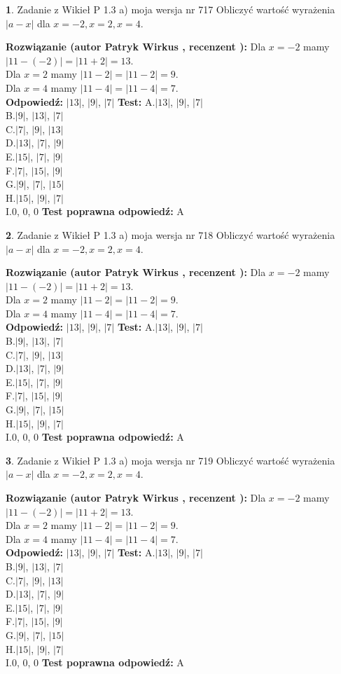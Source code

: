 \documentclass[12pt, a4paper]{article}
\theoremstyle{definition} %
\newtheorem{zad}{}
\newcommand{\zadStart}[1]{\begin{zad}#1\newline}
\newcommand{\zadStop}{\end{zad}}
\newcommand{\rozwStart}[2]{\noindent \textbf{Rozwiązanie (autor #1 , recenzent #2): }\newline}
\newcommand{\rozwStop}{\newline}
\newcommand{\odpStart}{\noindent \textbf{Odpowiedź:}\newline}
\newcommand{\odpStop}{\newline}
\newcommand{\testStart}{\noindent \textbf{Test:}\newline}
\newcommand{\testStop}{\newline}
\newcommand{\kluczStart}{\noindent \textbf{Test poprawna odpowiedź:}\newline}
\newcommand{\kluczStop}{\newline}
\begin{document}
\zadStart{Zadanie z Wikieł P 1.3 a) moja wersja nr 717}
Obliczyć wartość wyrażenia $|a - x|$ dla $x=-2,x=2,x=4$.
\zadStop
\rozwStart{Patryk Wirkus}{}
Dla $x = -2$ mamy $|11 - (-2)| = |11 + 2| = 13$.\\
Dla $x = 2$ mamy $|11 - 2| = |11 - 2| = 9$.\\
Dla $x = 4$ mamy $|11 - 4| = |11 - 4| = 7$.\\
\rozwStop
\odpStart
$|13|$, $|9|$, $|7|$
\odpStop
\testStart
A.$|13|$, $|9|$, $|7|$\\
B.$|9|$, $|13|$, $|7|$\\
C.$|7|$, $|9|$, $|13|$\\
D.$|13|$, $|7|$, $|9|$\\
E.$|15|$, $|7|$, $|9|$\\
F.$|7|$, $|15|$, $|9|$\\
G.$|9|$, $|7|$, $|15|$\\
H.$|15|$, $|9|$, $|7|$\\
I.$0$, $0$, $0$
\testStop
\kluczStart
A
\kluczStop



\zadStart{Zadanie z Wikieł P 1.3 a) moja wersja nr 718}
Obliczyć wartość wyrażenia $|a - x|$ dla $x=-2,x=2,x=4$.
\zadStop
\rozwStart{Patryk Wirkus}{}
Dla $x = -2$ mamy $|11 - (-2)| = |11 + 2| = 13$.\\
Dla $x = 2$ mamy $|11 - 2| = |11 - 2| = 9$.\\
Dla $x = 4$ mamy $|11 - 4| = |11 - 4| = 7$.\\
\rozwStop
\odpStart
$|13|$, $|9|$, $|7|$
\odpStop
\testStart
A.$|13|$, $|9|$, $|7|$\\
B.$|9|$, $|13|$, $|7|$\\
C.$|7|$, $|9|$, $|13|$\\
D.$|13|$, $|7|$, $|9|$\\
E.$|15|$, $|7|$, $|9|$\\
F.$|7|$, $|15|$, $|9|$\\
G.$|9|$, $|7|$, $|15|$\\
H.$|15|$, $|9|$, $|7|$\\
I.$0$, $0$, $0$
\testStop
\kluczStart
A
\kluczStop



\zadStart{Zadanie z Wikieł P 1.3 a) moja wersja nr 719}
Obliczyć wartość wyrażenia $|a - x|$ dla $x=-2,x=2,x=4$.
\zadStop
\rozwStart{Patryk Wirkus}{}
Dla $x = -2$ mamy $|11 - (-2)| = |11 + 2| = 13$.\\
Dla $x = 2$ mamy $|11 - 2| = |11 - 2| = 9$.\\
Dla $x = 4$ mamy $|11 - 4| = |11 - 4| = 7$.\\
\rozwStop
\odpStart
$|13|$, $|9|$, $|7|$
\odpStop
\testStart
A.$|13|$, $|9|$, $|7|$\\
B.$|9|$, $|13|$, $|7|$\\
C.$|7|$, $|9|$, $|13|$\\
D.$|13|$, $|7|$, $|9|$\\
E.$|15|$, $|7|$, $|9|$\\
F.$|7|$, $|15|$, $|9|$\\
G.$|9|$, $|7|$, $|15|$\\
H.$|15|$, $|9|$, $|7|$\\
I.$0$, $0$, $0$
\testStop
\kluczStart
A
\kluczStop
\end{document}
